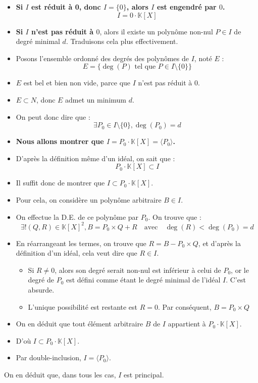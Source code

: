 \documentclass[11pt, a4paper]{article}
\theoremstyle{definition}
\begin{document}
\begin{itemize}
\item \textbf{Si $I$ est réduit à 0, donc $I = \{0\}$, alors $I$ est engendré par $0$.}
\[
I = 0 \cdot \mathbb K[X]
\]
\item \textbf{Si $I$ n'est pas réduit à $0$}, alors il existe un polynôme non-nul $P \in I$ de degré minimal $d$. Traduisons cela plus effectivement.
\item Posons l'ensemble ordonné des degrés des polynômes de $I$, noté $E$ :
\[
E = \{\deg(P) \text{ tel que } P \in I\setminus\{0\}\}
\]
\item $E$ est bel et bien non vide, parce que $I$ n'est pas réduit à 0.
\item $E \subset N$, donc $E$ admet un minimum $d$.
\item On peut donc dire que :
\[
\exists P_0 \in I\setminus\{0\}, \deg(P_0) = d
\]
\item \textbf{Nous allons montrer que $I = P_0 \cdot \mathbb{K}[X] = \langle P_0 \rangle$.}
\item D'après la définition même d'un idéal, on sait que :
\[
P_0\cdot \mathbb K[X] \subset I
\]
\item Il suffit donc de montrer que $I \subset P_0 \cdot \mathbb K [X]$.
\item Pour cela, on considère un polynôme arbitraire $B \in I$.
\item On effectue la D.E. de ce polynôme par $P_0$. On trouve que :
\[
\exists ! (Q,R) \in \mathbb K[X]^2, B = P_0 \times Q + R \quad \text{avec} \quad \deg(R) < \deg(P_0) = d
\]
\item En réarrangeant les termes, on trouve que $R = B - P_0 \times Q$, et d'après la définition d'un idéal, cela veut dire que $R \in I$.
\begin{itemize}
\item Si $R \ne 0$, alors son degré serait non-nul est inférieur à celui de $P_0$, or le degré de $P_0$ est défini comme étant le degré minimal de l'idéal $I$. C'est absurde.
\item L'unique possibilité est restante est $R = 0$. Par conséquent, $B = P_0\times Q$
\end{itemize}
\item On en déduit que tout élément arbitraire $B$ de $I$ appartient à $P_0 \cdot \mathbb K[X]$.
\item D'où $I \subset P_0 \cdot \mathbb K[X]$.
\item Par double-inclusion, $I = \langle P_0 \rangle$. 
\end{itemize}
On en déduit que, dans tous les cas, $I$ est principal.
\end{document}
